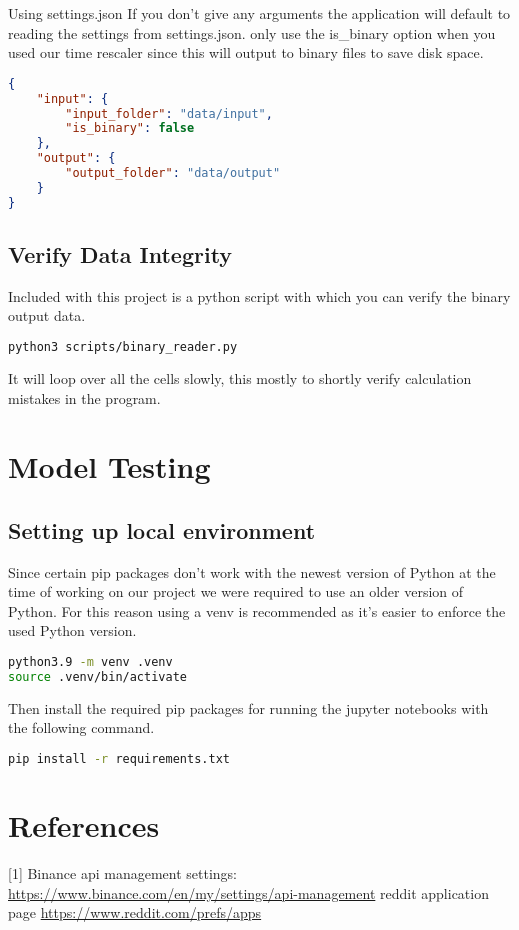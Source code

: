 \documentclass[12pt,a4paper]{article}
\begin{document}
Using settings.json
If you don't give any arguments the application will default to reading the settings from settings.json. only use the is\_binary option when you used our time rescaler since this will output to binary files to save disk space.

\begin{lstlisting}[language=json]
{
    "input": {
        "input_folder": "data/input",
        "is_binary": false
    },
    "output": {
        "output_folder": "data/output"
    }
}
\end{lstlisting}


\subsection{Verify Data Integrity}

Included with this project is a python script with which you can verify the binary output data.

\begin{lstlisting}[language=bash]
python3 scripts/binary_reader.py
\end{lstlisting}

It will loop over all the cells slowly, this mostly to shortly verify calculation mistakes in the program.

\section{Model Testing}

\subsection{Setting up local environment}

Since certain pip packages don't work with the newest version of Python at the time of working on our project we were required to use an older version of Python. For this reason using a venv is recommended as it's easier to enforce the used Python version.

\begin{lstlisting}[language=bash]
python3.9 -m venv .venv
source .venv/bin/activate
\end{lstlisting}

Then install the required pip packages for running the jupyter notebooks with the following command.

\begin{lstlisting}[language=bash]
pip install -r requirements.txt
\end{lstlisting}

\section{References}
[1] Binance api management settings: \newline \href{https://www.binance.com/en/my/settings/api-management}{https://www.binance.com/en/my/settings/api-management}
\newline
[2] reddit application page \href{https://www.reddit.com/prefs/apps}{https://www.reddit.com/prefs/apps}
\end{document}
